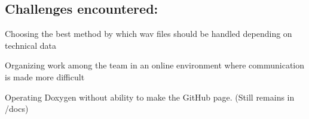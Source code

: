 \subsection*{Challenges encountered\+:}


\begin{DoxyItemize}
\item Choosing the best method by which wav files should be handled depending on technical data
\item Organizing work among the team in an online environment where communication is made more difficult
\item Operating Doxygen without ability to make the Git\+Hub page. (Still remains in /docs) 
\end{DoxyItemize}